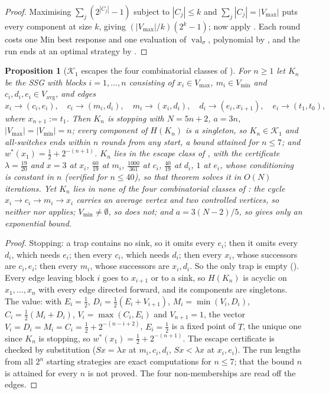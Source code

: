 \documentclass[11pt]{article}
\theoremstyle{plain}
\newtheorem{proposition}[theorem]{Proposition}
\theoremstyle{definition}
\DeclareMathOperator{\val}{val}
\newcommand{\Vmax}{V_{\max}}
\newcommand{\Vmin}{V_{\min}}
\newcommand{\Vavg}{V_{\mathrm{avg}}}
\begin{document}
\begin{proof}
Maximising $\sum_j(2^{|C_j|}-1)$ subject to $|C_j|\le k$ and
$\sum_j|C_j|=|\Vmax|$ puts every component at size $k$, giving
$(|\Vmax|/k)(2^{k}-1)$; now apply . Each round
costs one Min best response and one evaluation of $\val_\sigma$,
polynomial by , and the run ends at an optimal
strategy by .
\end{proof}

\begin{proposition}[$\mathcal K_1$ escapes the four combinatorial classes of
]\label{prop:k1-family}
For $n\ge1$ let $K_n$ be the SSG with blocks $i=1,\dots,n$ consisting of
$x_i\in\Vmax$, $m_i\in\Vmin$ and $c_i,d_i,e_i\in\Vavg$, and edges
\[
  x_i\to(c_i,e_i),\quad c_i\to(m_i,d_i),\quad m_i\to(x_i,d_i),\quad
  d_i\to(e_i,x_{i+1}),\quad e_i\to(t_1,t_0),
\]
where $x_{n+1}:=t_1$. Then $K_n$ is stopping with $N=5n+2$,
$a=3n$, $|\Vmax|=|\Vmin|=n$; every component of $H(K_n)$ is a singleton,
so $K_n\in\mathcal K_1$ and all-switches ends within $n$ rounds from any
start, a bound attained for $n\le7$; and $w^\ast(x_1)=\tfrac12+2^{-(n+1)}$.
$K_n$ lies in the escape class of , with the
certificate $\lambda=\tfrac{19}{20}$ and $x=3$ at $x_i$, $\tfrac{60}{19}$
at $m_i$, $\tfrac{1000}{361}$ at $c_i$, $\tfrac{40}{19}$ at $d_i$, $1$ at
$e_i$, whose conditioning is constant in $n$ (verified for $n\le40$), so
that theorem solves it in $O(N)$ iterations. Yet
$K_n$ lies in none of the four combinatorial classes of : the cycle
$x_i\to c_i\to m_i\to x_i$ carries an average vertex and two controlled
vertices, so neither  nor 
applies; $\Vmin\ne\emptyset$, so  does not; and
$a=3(N-2)/5$, so  gives only an exponential bound.
\end{proposition}

\begin{proof}
Stopping: a trap contains no sink, so it omits every $e_i$; then it omits
every $d_i$, which needs $e_i$; then every $c_i$, which needs $d_i$; then
every $x_i$, whose successors are $c_i,e_i$; then every $m_i$, whose
successors are $x_i,d_i$. So the only trap is empty
(). Every edge leaving block $i$ goes to $x_{i+1}$ or
to a sink, so $H(K_n)$ is acyclic on $x_1,\dots,x_n$ with every edge
directed forward, and its components are singletons. The value: with
$E_i=\tfrac12$, $D_i=\tfrac12(E_i+V_{i+1})$, $M_i=\min(V_i,D_i)$,
$C_i=\tfrac12(M_i+D_i)$, $V_i=\max(C_i,E_i)$ and $V_{n+1}=1$, the vector
$V_i=D_i=M_i=C_i=\tfrac12+2^{-(n-i+2)}$, $E_i=\tfrac12$ is a fixed point
of $T$, the unique one since $K_n$ is stopping, so
$w^\ast(x_1)=\tfrac12+2^{-(n+1)}$. The escape certificate is checked by
substitution ($Sx=\lambda x$ at $m_i,c_i,d_i$, $Sx<\lambda x$ at $x_i,e_i$).
The run lengths from all $2^{n}$ starting strategies are exact
computations for $n\le7$; that the bound $n$ is attained for every $n$ is
not proved. The four non-memberships are read off the edges.
\end{proof}
\end{document}
